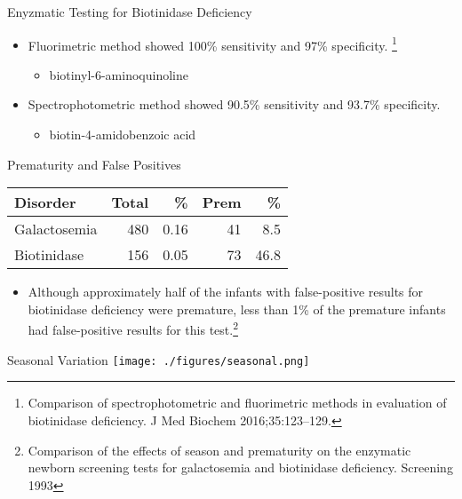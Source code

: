 \documentclass[presentation, smaller]{beamer}
\begin{document}
\begin{frame}[label={sec:orgheadline7}]{Enyzmatic Testing for Biotinidase Deficiency}
\begin{itemize}
\item Fluorimetric method showed 100\% sensitivity and 97\% specificity. \footnote{Comparison of spectrophotometric and fluorimetric
methods in evaluation of biotinidase deficiency. J Med Biochem 2016;35:123–129.}
\begin{itemize}
\item biotinyl-6-aminoquinoline
\end{itemize}
\item Spectrophotometric method showed 90.5\% sensitivity and 93.7\% specificity.
\begin{itemize}
\item biotin-4-amidobenzoic acid
\end{itemize}
\end{itemize}
\end{frame}


\begin{frame}[label={sec:orgheadline8}]{Prematurity and False Positives}
\begin{center}
\begin{tabular}{lrrrr}
Disorder & Total & \% & Prem & \%\\
\hline
Galactosemia & 480 & 0.16 & 41 & 8.5\\
Biotinidase & 156 & 0.05 & 73 & 46.8\\
\end{tabular}
\end{center}

\begin{itemize}
\item Although approximately half of the infants with false-positive
results for biotinidase deficiency were premature, less than 1\% of
the premature infants had false-positive results for this test.\footnote{Comparison of the effects of season and prematurity on the
enzymatic newborn screening tests for galactosemia and biotinidase
deficiency. Screening 1993}
\end{itemize}
\end{frame}


\begin{frame}[label={sec:orgheadline9}]{Seasonal Variation}
\texttt{[image: ./figures/seasonal.png]}
\end{frame}
\end{document}
